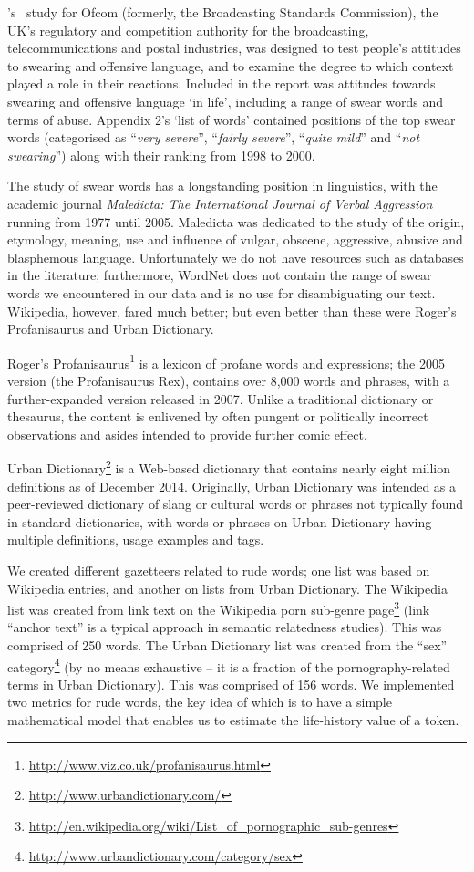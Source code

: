 \documentclass[letterpaper]{article}
\begin{document}
\citeauthor{millwood-hargrave:2000}'s~
study for Ofcom (formerly, the Broadcasting Standards Commission), the
UK's regulatory and competition authority for the broadcasting,
telecommunications and postal industries, was designed to test
people's attitudes to swearing and offensive language, and to examine
the degree to which context played a role in their reactions. Included
in the report was attitudes towards swearing and offensive language
`in life', including a range of swear words and terms of
abuse. Appendix 2's `list of words' contained positions of the top
swear words (categorised as ``{\emph{very severe}}'', ``{\emph{fairly
severe}}'', ``{\emph{quite mild}}'' and ``{\emph{not swearing}}'')
along with their ranking from 1998 to 2000.

The study of swear words has a longstanding position in linguistics,
with the academic journal {\emph{Maledicta: The International Journal of
Verbal Aggression}} running from 1977 until 2005. Maledicta was
dedicated to the study of the origin, etymology, meaning, use and
influence of vulgar, obscene, aggressive, abusive and blasphemous
language. Unfortunately we do not have resources such as databases in
the literature; furthermore, WordNet does not contain the range of
swear words we encountered in our data and is no use for disambiguating
our text. Wikipedia, however, fared much better; but even better than
these were Roger's Profanisaurus and Urban Dictionary.

Roger's
Profanisaurus\footnote{\url{http://www.viz.co.uk/profanisaurus.html}}
is a lexicon of profane words and expressions; the 2005 version (the
Profanisaurus Rex), contains over 8,000 words and phrases, with a
further-expanded version released in 2007. Unlike a traditional
dictionary or thesaurus, the content is enlivened by often pungent or
politically incorrect observations and asides intended to provide
further comic effect.

Urban Dictionary\footnote{\url{http://www.urbandictionary.com/}} is a
Web-based dictionary that contains nearly eight million definitions as
of December 2014. Originally, Urban Dictionary was intended as a
peer-reviewed dictionary of slang or cultural words or phrases not
typically found in standard dictionaries, with words or phrases on
Urban Dictionary having multiple definitions, usage examples and tags.

We created different gazetteers related to rude words; one list was
based on Wikipedia entries, and another on lists from Urban
Dictionary. The Wikipedia list was created from link text on the
Wikipedia porn sub-genre
page\footnote{\url{http://en.wikipedia.org/wiki/List_of_pornographic_sub-genres}}
(link ``anchor text'' is a typical approach in semantic relatedness
studies). This was comprised of 250 words. The Urban Dictionary list
was created from the ``sex''
category\footnote{\url{http://www.urbandictionary.com/category/sex}}
(by no means exhaustive -- it is a fraction of the pornography-related
terms in Urban Dictionary). This was comprised of 156 words. We
implemented two metrics for rude words, the key idea of which is to
have a simple mathematical model that enables us to estimate the
life-history value of a token.\\
\end{document}

